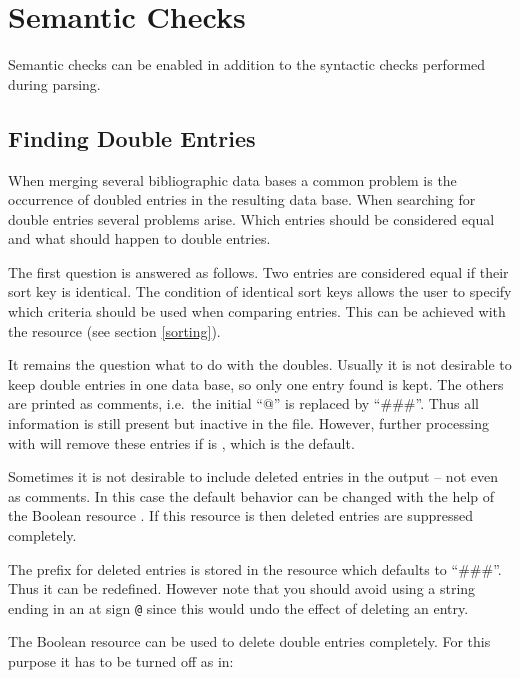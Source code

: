 \documentclass[11pt,a4paper]{scrbook}
\begin{document}
\section{Semantic Checks}

Semantic checks can be enabled in addition to the syntactic checks performed
during parsing.

\subsection{Finding Double Entries}

When merging several bibliographic data bases a common problem is the
occurrence of doubled entries in the resulting data base. When searching for
double entries several problems arise. Which entries should be considered
equal and what should happen to double entries.

The first question is answered as follows. Two entries are considered equal if
their sort key is identical. The condition of identical sort keys allows the
user to specify which criteria should be used when comparing entries. This can
be achieved with the resource  (see section \ref{sorting}).

It remains the question what to do with the doubles. Usually it is not
desirable to keep double entries in one data base, so only one entry found is
kept. The others are printed as comments, i.e.\ the initial ``@'' is replaced
by ``\#\#\#''. Thus all information is still present but inactive in the
\BibTeX{} file. However, further processing with \BibTool{} will remove these
entries if  is , which is the default.

Sometimes it is not desirable to include deleted entries in the output -- not
even as comments. In this case the default behavior can be changed with the
help of the Boolean resource . If this resource is
 then deleted entries are suppressed completely.

The prefix for deleted entries is stored in the resource
 which defaults to ``\#\#\#''. Thus it can be
redefined. However note that you should avoid using a string ending in an at
sign \texttt{@} since this would undo the effect of deleting an entry.

The Boolean resource  can be used to delete double
entries completely. For this purpose it has to be turned off as in:
\end{document}

